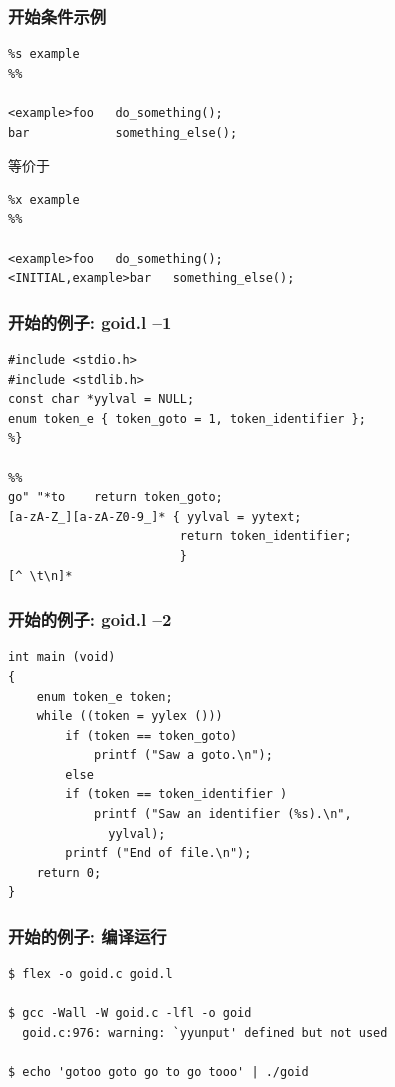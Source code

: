 \documentclass[compress]{beamer}
\begin{document}
\begin{frame}[containsverbatim]
\frametitle{开始条件示例}

\begin{Verbatim}
%s example
%%

<example>foo   do_something();
bar            something_else();
\end{Verbatim} 
等价于 
\begin{Verbatim}
%x example
%%

<example>foo   do_something();
<INITIAL,example>bar   something_else();
\end{Verbatim}
\end{frame}

\begin{frame}[containsverbatim]
\frametitle{开始的例子: goid.l --1}

\begin{Verbatim}[label=goid.l]
%{
#include <stdio.h>
#include <stdlib.h>
const char *yylval = NULL;
enum token_e { token_goto = 1, token_identifier };
%}

%%
go" "*to    return token_goto;
[a-zA-Z_][a-zA-Z0-9_]* { yylval = yytext;
                        return token_identifier;
                        }
[^ \t\n]*
\end{Verbatim}
\end{frame}


\begin{frame}[containsverbatim]
\frametitle{开始的例子: goid.l --2}
\begin{Verbatim}[firstnumber=last, label=goid.l]
%%
int main (void)
{
    enum token_e token;
    while ((token = yylex ()))
        if (token == token_goto)
            printf ("Saw a goto.\n");
        else
        if (token == token_identifier )
            printf ("Saw an identifier (%s).\n",
              yylval);
        printf ("End of file.\n");
    return 0;
}
\end{Verbatim}
\end{frame}

\begin{frame}[containsverbatim]
\frametitle{开始的例子: 编译运行}

{\footnotesize
\begin{Verbatim}
$ flex -o goid.c goid.l

$ gcc -Wall -W goid.c -lfl -o goid
  goid.c:976: warning: `yyunput' defined but not used

$ echo 'gotoo goto go to go tooo' | ./goid
\end{Verbatim}
}
\end{frame}
\end{document}
